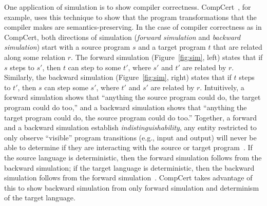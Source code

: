 One application of simulation is to show compiler correctness.
CompCert~\citep{Leroy2009}, for example, uses this technique to show that the
program transformations that the compiler makes are semantics-preserving.
In the case of compiler correctness as in CompCert, both directions of simulation (\textit{forward simulation} and \textit{backward simulation})
start with a source program $s$ and a target program $t$ that are related along some relation $r$.
%
The forward simulation (Figure~\ref{fig:sim}, left) states that if $s$ steps to $s'$, then $t$ can step to some $t'$, where $s'$ and $t'$ are related by $r$.
Similarly, the backward simulation (Figure~\ref{fig:sim}, right) states that if $t$ steps to $t'$, then $s$ can step some $s'$, where $t'$ and $s'$ are related by $r$.
Intuitively,
  a forward simulation shows that
  ``anything the source program could do, the target program could do too,'' and
  a backward simulation shows that
  ``anything the target program could do, the source program could do too.''
Together,
  a forward and a backward simulation establish \textit{indistinguishability},
  any entity restricted to only observe ``visible'' program transitions
  (e.g., input and output) will never be able to determine if they
  are interacting with the source or target program~\citep{Sangiorgi2011}.
If the source language is deterministic, then the forward simulation follows from the backward simulation;
if the target language is deterministic, then the backward simulation follows from the forward simulation~\citep{Leroy2009}.
CompCert takes advantage of this to show backward simulation from only forward simulation and determinism of the target language.

